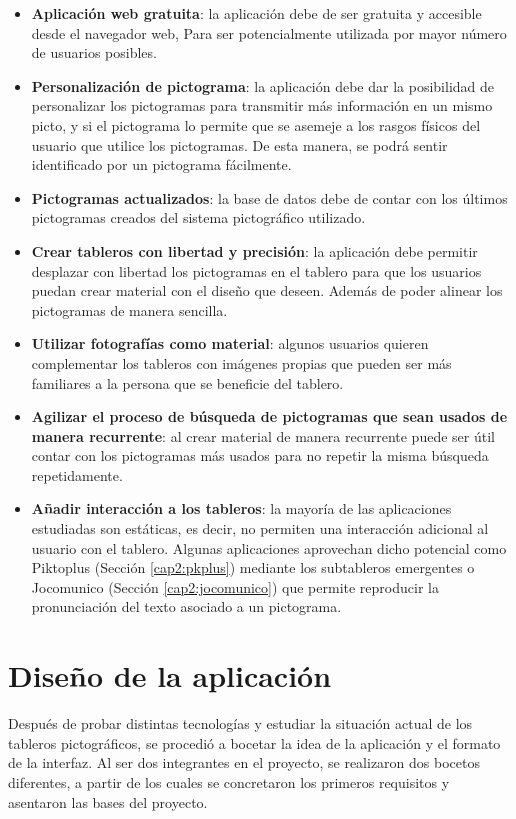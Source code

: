 \begin{itemize}
	
	\item \textbf{Aplicación web gratuita}: la aplicación debe de ser gratuita y accesible desde el navegador web, Para ser potencialmente utilizada por mayor número de usuarios posibles.
	\item \textbf{Personalización de pictograma}: la aplicación debe dar la posibilidad de personalizar los pictogramas para transmitir más información en un mismo picto, y si el pictograma lo permite que se asemeje a los rasgos físicos del usuario que utilice los pictogramas. De esta manera, se podrá sentir identificado por un pictograma fácilmente. 
	\item \textbf{Pictogramas actualizados}: la base de datos debe de contar con los últimos pictogramas creados del sistema pictográfico utilizado. 
	\item \textbf{Crear tableros con libertad y precisión}: la aplicación debe permitir desplazar con libertad los pictogramas en el tablero para que los usuarios puedan crear material con el diseño que deseen. Además de poder alinear los pictogramas de manera sencilla.  
	\item \textbf{Utilizar fotografías como material}: algunos usuarios quieren complementar los tableros con imágenes propias que pueden ser más familiares a la persona que se beneficie del tablero. 
	\item \textbf{Agilizar el proceso de búsqueda de pictogramas que sean usados de manera recurrente}: al crear material de manera recurrente puede ser útil contar con los pictogramas más usados para no repetir la misma búsqueda repetidamente. 
	\item \textbf{Añadir interacción a los tableros}: la mayoría de las aplicaciones estudiadas son estáticas, es decir, no permiten una interacción adicional al usuario con el tablero. Algunas aplicaciones aprovechan dicho potencial como Piktoplus (Sección \ref{cap2:pkplus}) mediante los subtableros emergentes o Jocomunico (Sección \ref{cap2:jocomunico}) que permite reproducir la pronunciación del texto asociado a un pictograma.
	
\end{itemize}






\section{Diseño de la aplicación}
\label{cap4:diseñoapp}
Después de probar distintas tecnologías y estudiar la situación actual de los tableros pictográficos, se procedió a bocetar la idea de la aplicación y el formato de la interfaz. Al ser dos integrantes en el proyecto, se realizaron dos bocetos diferentes, a partir de los cuales se concretaron los primeros requisitos y asentaron las bases del proyecto.


